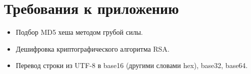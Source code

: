 \documentclass[a4paper,12pt]{article}
\begin{document}
\newpage


\section{Требования к приложению}
\begin{itemize}
    \item Подбор MD5 хеша методом грубой силы.
    \item Дешифровка криптографического алгоритма RSA.
    \item Перевод строки из UTF-8 в base16 (другими словами hex), base32, base64. 
\end{itemize}


\newpage

\end{document}
